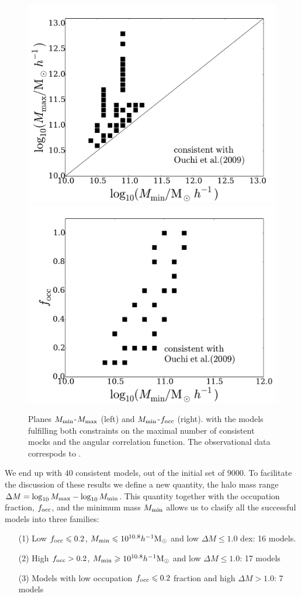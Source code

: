 \documentclass[usenatbib]{mn2e}
\newcommand{\hMsun}{{\ifmmode{h^{-1}{\rm
        {M_{\odot}}}}\else{$h^{-1}{\rm{M_{\odot}}}$}\fi}}
\begin{document}
\begin{figure}
\begin{center}
\includegraphics[width=0.46\linewidth,angle=0]{Fig6_mass.pdf}
\hspace{5mm}
\includegraphics[width=0.46\linewidth,angle=0]{Fig6_f_occ.pdf}
\end{center}
\caption{Planes $M_{\rm min}$-$M_{\rm max}$ (left) and $M_{\rm
    min}$-$f_{\rm occ}$ (right). with the models fulfilling both
   constraints on the maximal number of consistent mocks and the
  angular correlation function. The observational data correspods to
  \citet{Ouchi2010}.   
  \label{fig:restriction_mock_and_f_occ_corr}} 
\end{figure} 



We end up with $40$ consistent models, out of the initial set of
$9000$. To facilitate the discussion of these results we define a new
quantity, the halo mass range $\Delta M=\log_{10}M_{\rm max} -
\log_{10}M_{\rm  min}$. This quantity together with the occupation
fraction, $f_{\rm occ}$, and the minimum mass $M_{\rm min}$ allows us
to clasify all the successful models into three families:    
 

\begin{itemize}
\item[(1)] Low $f_{\rm occ}\leq 0.2$, $M_{\rm min}\leq 10^{10.8}\hMsun$ and low $\Delta M\leq 1.0$
  dex: 16 models. 
\item[(2)] High $f_{\rm occ}> 0.2$, $M_{\rm min}\geq 10^{10.8}\hMsun$ and
  low $\Delta M\leq 1.0$: 17 models 

\item[(3)] Models with low occupation $f_{\rm occ}\leq 0.2$ fraction
  and high $\Delta M>1.0$: 7 models
\end{itemize}
\end{document}
